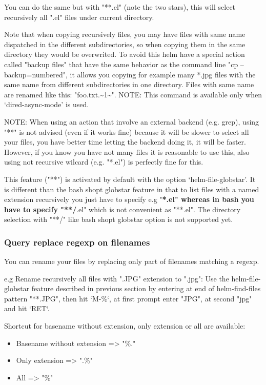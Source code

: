 \documentclass[11pt]{article}
\begin{document}
You can do the same but with "**.el" (note the two stars),
this will select recursively all ".el" files under current directory.

Note that when copying recursively files, you may have files with same name
dispatched in the different subdirectories, so when copying them in the same directory
they would be overwrited. To avoid this helm have a special action called "backup files"
that have the same behavior as the command line "cp --backup=numbered", it allows you
copying for example many *.jpg files with the same name from different
subdirectories in one directory.
Files with same name are renamed like this: "foo.txt.\textasciitilde{}1\textasciitilde{}".
NOTE: This command is available only when ‘dired-async-mode’ is used.

NOTE: When using an action that involve an external backend (e.g. grep), using "**"
is not advised (even if it works fine) because it will be slower to select all your files,
you have better time letting the backend doing it, it will be faster.
However, if you know you have not many files it is reasonable to use this,
also using not recursive wilcard (e.g. "*.el") is perfectly fine for this.

This feature ("**") is activated by default with the option ‘helm-file-globstar’.
It is different than the bash shopt globstar feature in that to list files with a named extension
recursively you just have to specify e.g "\textbf{*.el" whereas in bash you have to specify "**/}.el"
which is not convenient as "**.el".
The directory selection with "**/" like bash shopt globstar option is not supported yet.

\subsubsection{Query replace regexp on filenames}
\label{sec:orgb6d5d01}

You can rename your files by replacing only part of filenames matching
a regexp.

e.g Rename recursively all files with ".JPG" extension to ".jpg":
Use the helm-file-globstar feature described in previous section by
entering at end of helm-find-files pattern "**.JPG", then hit ‘M-\%‘,
at first prompt enter "JPG", at second "jpg" and hit ‘RET‘.

Shortcut for basename without extension, only extension or all are available:

\begin{itemize}
\item Basename without extension => "\%."
\item Only extension             => ".\%"
\item All                        => "\%"
\end{itemize}
\end{document}
